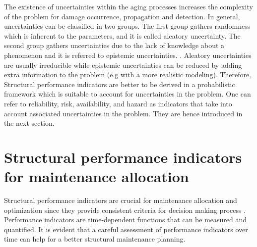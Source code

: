 The existence of uncertainties within the aging processes increases the complexity of the problem for damage occurrence, propagation and detection. In 
general, uncertainties can be classified in two groups. The first group gathers randomness which is inherent to the parameters, and it is called aleatory uncertainty. 
The second group gathers uncertainties due to the lack of knowledge about a phenomenon and it is referred to epistemic uncertainties. \citep{RAHMAN201862, KARANKI201791, FERCHICHI201724}. 
Aleatory uncertainties are usually irreducible while epistemic uncertainties can be reduced by adding extra information to the problem (e.g with a more realistic modeling). 
Therefore, Structural performance indicators are better to be derived in a probabilistic framework which is suitable to account for uncertainties in the problem. One can refer to 
reliability, risk, availability, and hazard as indicators that take into account associated uncertainties in the problem. They are hence introduced in the next section. 



\section{Structural performance indicators for maintenance allocation}
\label{sec:indic}
\noindent
Structural performance indicators are crucial for maintenance allocation and optimization since they provide consistent criteria for decision making process \citep{Ghosn2016}. 
Performance indicators are time-dependent functions that can be measured and quantified. It is evident that a careful assessment of performance indicators over time can help
for a better structural maintenance planning. 

